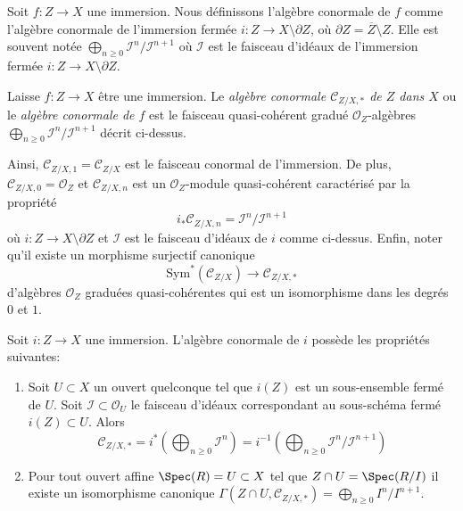 \medskip\noindent
Soit  $f : Z \to X$  une immersion. Nous définissons l'algèbre conormale de
 $f$  comme l'algèbre conormale de l'immersion fermée  $i : Z \to X \setminus \partial Z$, où
 $\partial Z = \overline{Z} \setminus Z$. Elle est souvent notée  $\bigoplus_{n \geq 0} \mathcal{I}^n/\mathcal{I}^{n + 1}$  où  $\mathcal{I}$  est le faisceau
d'idéaux de l'immersion fermée  $i : Z \to X \setminus \partial Z$.

\begin{definition}
\label{definition-conormal-sheaf}
Laisse $f : Z \to X$ être une immersion. Le {\it algèbre
conormale $\mathcal{C}_{Z/X, *}$  de  $Z$ dans $X$}  ou le
 {\it algèbre conormale de $f$} est le
faisceau quasi-cohérent gradué $\mathcal{O}_Z$-algèbres $\bigoplus_{n \geq 0} \mathcal{I}^n/\mathcal{I}^{n + 1}$  décrit ci-dessus.
\end{definition}

\noindent
Ainsi,  $\mathcal{C}_{Z/X, 1} = \mathcal{C}_{Z/X}$  est le faisceau conormal de l'immersion. De plus,  $\mathcal{C}_{Z/X, 0} = \mathcal{O}_Z$ 
et  $\mathcal{C}_{Z/X, n}$  est un  $\mathcal{O}_Z$-module quasi-cohérent caractérisé par la
propriété
\begin{equation}
\label{equation-conormal-in-degree-n}
i_*\mathcal{C}_{Z/X, n} = \mathcal{I}^n/\mathcal{I}^{n + 1}
\end{equation}
où  $i : Z \to X \setminus \partial Z$  et  $\mathcal{I}$  est le faisceau d'idéaux de  $i$  comme
ci-dessus. Enfin, noter qu'il existe un morphisme surjectif canonique
\begin{equation}
\label{equation-conormal-algebra-quotient}
\text{Sym}^*(\mathcal{C}_{Z/X}) \longrightarrow \mathcal{C}_{Z/X, *}
\end{equation}
d'algèbres  $\mathcal{O}_Z$ graduées quasi-cohérentes qui est un isomorphisme dans les
degrés  $0$  et  $1$.

\begin{lemma}
\label{lemma-affine-conormal-sheaf}
Soit  $i : Z \to X$  une immersion. L'algèbre conormale de  $i$  possède les
propriétés suivantes:
\begin{enumerate}
\item Soit  $U \subset X$  un ouvert quelconque tel que  $i(Z)$  est un sous-ensemble
fermé de  $U$. Soit  $\mathcal{I} \subset \mathcal{O}_U$  le faisceau d'idéaux correspondant au
sous-schéma fermé  $i(Z) \subset U$. Alors
$$
\mathcal{C}_{Z/X, *} =
i^*\left(\bigoplus\nolimits_{n \geq 0} \mathcal{I}^n\right) =
i^{-1}\left(
\bigoplus\nolimits_{n \geq 0} \mathcal{I}^n/\mathcal{I}^{n + 1}
\right)
$$
\item Pour tout ouvert affine  $\Spec(R) = U \subset X$  tel que  $Z \cap U = \Spec(R/I)$  il existe un
isomorphisme canonique  $\Gamma(Z \cap U, \mathcal{C}_{Z/X, *}) = \bigoplus_{n \geq 0} I^n/I^{n + 1}$.
\end{enumerate}
\end{lemma}

